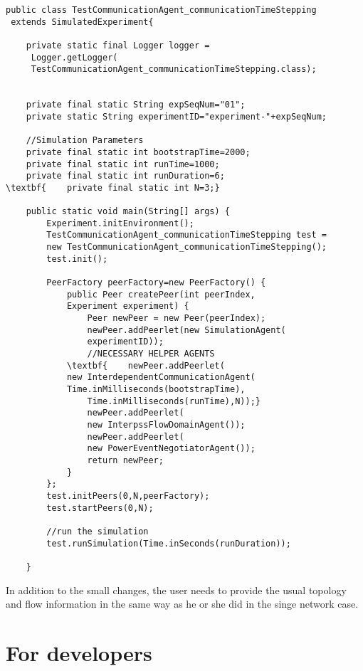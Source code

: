\documentclass[11pt,fleqn]{book} %
\begin{document}
\begin{lstlisting}[frame=single] 
public class TestCommunicationAgent_communicationTimeStepping
 extends SimulatedExperiment{
	
	private static final Logger logger =
	 Logger.getLogger(
	 TestCommunicationAgent_communicationTimeStepping.class);
	
	
	private final static String expSeqNum="01";
	private static String experimentID="experiment-"+expSeqNum;
	
	//Simulation Parameters
	private final static int bootstrapTime=2000;
	private final static int runTime=1000;
	private final static int runDuration=6;
\textbf{	private final static int N=3;}
	
	public static void main(String[] args) {
		Experiment.initEnvironment();
		TestCommunicationAgent_communicationTimeStepping test = 
		new TestCommunicationAgent_communicationTimeStepping();
		test.init();
		
		PeerFactory peerFactory=new PeerFactory() {
			public Peer createPeer(int peerIndex, 
			Experiment experiment) {
				Peer newPeer = new Peer(peerIndex);
				newPeer.addPeerlet(new SimulationAgent(
				experimentID));
				//NECESSARY HELPER AGENTS
			\textbf{	newPeer.addPeerlet(
			new InterdependentCommunicationAgent(
			Time.inMilliseconds(bootstrapTime),
				Time.inMilliseconds(runTime),N));}
				newPeer.addPeerlet(
				new InterpssFlowDomainAgent());
				newPeer.addPeerlet(
				new PowerEventNegotiatorAgent());
				return newPeer;
			}
		};
		test.initPeers(0,N,peerFactory);
		test.startPeers(0,N);
		
		//run the simulation
		test.runSimulation(Time.inSeconds(runDuration));
		
	}
\end{lstlisting}

In addition to the small changes, the user needs to provide the usual topology and flow information in the same way as he or she did in the singe network case.






\part{For developers}
\end{document}
